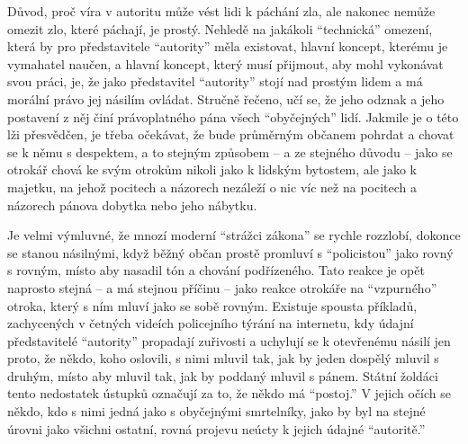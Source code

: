 \documentclass{book}
\begin{document}
Důvod, proč víra v autoritu může vést lidi k páchání zla, ale nakonec nemůže omezit zlo, které páchají, je prostý. Nehledě na jakákoli \enquote{technická} omezení, která by pro představitele \enquote{autority} měla existovat, hlavní koncept, kterému je vymahatel naučen, a hlavní koncept, který musí přijmout, aby mohl vykonávat svou práci, je, že jako představitel \enquote{autority} stojí nad prostým lidem a má morální právo jej násilím ovládat. Stručně řečeno, učí se, že jeho odznak a jeho postavení z něj činí právoplatného pána všech \enquote{obyčejných} lidí. Jakmile je o této lži přesvědčen, je třeba očekávat, že bude průměrným občanem pohrdat a chovat se k němu s despektem, a to stejným způsobem -- a ze stejného důvodu -- jako se otrokář chová ke svým otrokům nikoli jako k lidským bytostem, ale jako k majetku, na jehož pocitech a názorech nezáleží o nic víc než na pocitech a názorech pánova dobytka nebo jeho nábytku.

Je velmi výmluvné, že mnozí moderní \enquote{strážci zákona} se rychle rozzlobí, dokonce se stanou násilnými, když běžný občan prostě promluví s \enquote{policistou} jako rovný s rovným, místo aby nasadil tón a chování podřízeného. Tato reakce je opět naprosto stejná -- a má stejnou příčinu -- jako reakce otrokáře na \enquote{vzpurného} otroka, který s ním mluví jako se sobě rovným. Existuje spousta příkladů, zachycených v četných videích policejního týrání na internetu, kdy údajní představitelé \enquote{autority} propadají zuřivosti a uchylují se k otevřenému násilí jen proto, že někdo, koho oslovili, s nimi mluvil tak, jak by jeden dospělý mluvil s druhým, místo aby mluvil tak, jak by poddaný mluvil s pánem. Státní žoldáci tento nedostatek ústupků označují za to, že někdo má \enquote{postoj.} V jejich očích se někdo, kdo s nimi jedná jako s obyčejnými smrtelníky, jako by byl na stejné úrovni jako všichni ostatní, rovná projevu neúcty k jejich údajné \enquote{autoritě.}
\end{document}
